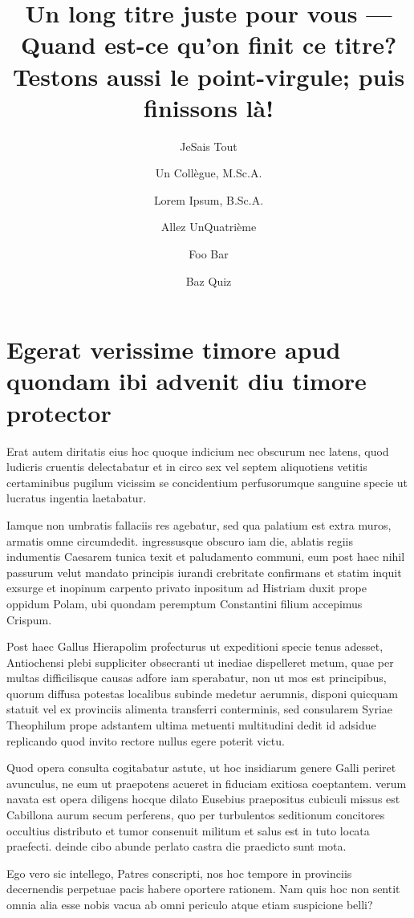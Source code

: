 ﻿\documentclass{SchoolReport}
\title{Un long titre juste pour vous --- Quand est-ce qu’on finit ce titre? Testons aussi le point-virgule; puis finissons là!}
\author{JeSais Tout \and Un Collègue, M.Sc.A. \and Lorem Ipsum, B.Sc.A. \and Allez UnQuatrième \and Foo Bar \and Baz Quiz}
\begin{document}
\tableofcontents
\listoftables
\listoffigures


\chapter{Egerat verissime timore apud quondam ibi advenit diu timore protector}
Erat autem diritatis eius hoc quoque indicium nec obscurum nec latens, quod ludicris cruentis delectabatur et in circo sex vel septem aliquotiens vetitis certaminibus pugilum vicissim se concidentium perfusorumque sanguine specie ut lucratus ingentia laetabatur.

Iamque non umbratis fallaciis res agebatur, sed qua palatium est extra muros, armatis omne circumdedit. ingressusque obscuro iam die, ablatis regiis indumentis Caesarem tunica texit et paludamento communi, eum post haec nihil passurum velut mandato principis iurandi crebritate confirmans et statim inquit exsurge et inopinum carpento privato inpositum ad Histriam duxit prope oppidum Polam, ubi quondam peremptum Constantini filium accepimus Crispum.

Post haec Gallus Hierapolim profecturus ut expeditioni specie tenus adesset, Antiochensi plebi suppliciter obsecranti ut inediae dispelleret metum, quae per multas difficilisque causas adfore iam sperabatur, non ut mos est principibus, quorum diffusa potestas localibus subinde medetur aerumnis, disponi quicquam statuit vel ex provinciis alimenta transferri conterminis, sed consularem Syriae Theophilum prope adstantem ultima metuenti multitudini dedit id adsidue replicando quod invito rectore nullus egere poterit victu.

Quod opera consulta cogitabatur astute, ut hoc insidiarum genere Galli periret avunculus, ne eum ut praepotens acueret in fiduciam exitiosa coeptantem. verum navata est opera diligens hocque dilato Eusebius praepositus cubiculi missus est Cabillona aurum secum perferens, quo per turbulentos seditionum concitores occultius distributo et tumor consenuit militum et salus est in tuto locata praefecti. deinde cibo abunde perlato castra die praedicto sunt mota.

Ego vero sic intellego, Patres conscripti, nos hoc tempore in provinciis \citetext{{E}uropean {A}ssociation for {S}tandardizing {I}nformation and {C}ommunication {S}ystems ({ECMA}), \citeyear{ECMA-262-v6}} decernendis perpetuae pacis habere oportere rationem. Nam quis hoc non sentit omnia alia esse nobis vacua ab omni periculo atque etiam suspicione belli?
\end{document}
